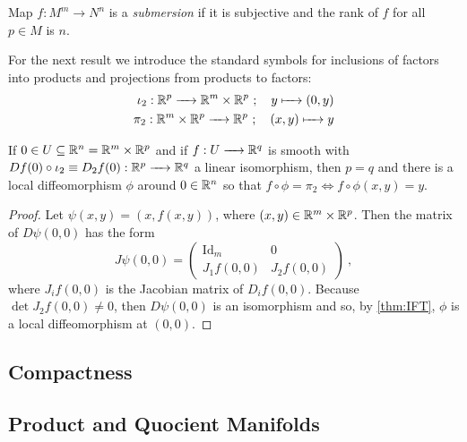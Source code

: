 \begin{definition}
	Map $f:M^m \to N^n$ is a \emph{submersion} if it is subjective and the rank of $f$ for all $p\in M$ is $n$.
\end{definition}

\begin{notation}
	For the next result we introduce the standard symbols for inclusions of factors into products and projections from products to factors:
	\begin{align*}
		\iota_2 : \bbR^p \to \bbR^m \times \bbR^p ~;\quad y \mapsto (0, y) \\
		\pi_2 : \bbR^m \times \bbR^p \to \bbR^p ~;\quad (x,y) \mapsto y
	\end{align*}
\end{notation}

\begin{corollary} \label{thm:Submersion}
	If $0 \in U \subseteq \mathbb R^n = \mathbb R^m \times \mathbb R^p$ and if $f: U \to \bbR^q$ is smooth with $D f(0) \circ \iota_2 \equiv D_2 f(0) : \bbR^p \to \bbR^q$ a linear isomorphism, then $p=q$ and there is a local diffeomorphism $\phi$ around $0 \in \mathbb R^n$ so that $f\circ \phi = \pi_2 \Leftrightarrow f\circ\phi (x,y) = y$.
\end{corollary}

\begin{proof}
	Let $\psi(x,y)=(x,f(x,y))$, where $(x,y)\in \mathbb R^m\times\mathbb R^p$. Then the matrix of $D\psi(0,0)$ has the form
	$$ J\psi(0,0) = \begin{pmatrix}
		\mathrm{Id}_m	& 0			\\
		J_1 f(0,0)		& J_2 f(0,0)
	\end{pmatrix} ~,$$
	where $J_i f(0,0)$ is the Jacobian matrix of $D_i f(0,0)$.
	Because $\det J_2 f(0,0) \ne 0$, then $D\psi(0,0)$ is an isomorphism and so, by \cref{thm:IFT}, $\phi$ is a local diffeomorphism at $(0,0)$.
	
\end{proof}

\subsection{Compactness}

\subsection{Product and Quocient Manifolds}




\cleardoublepage